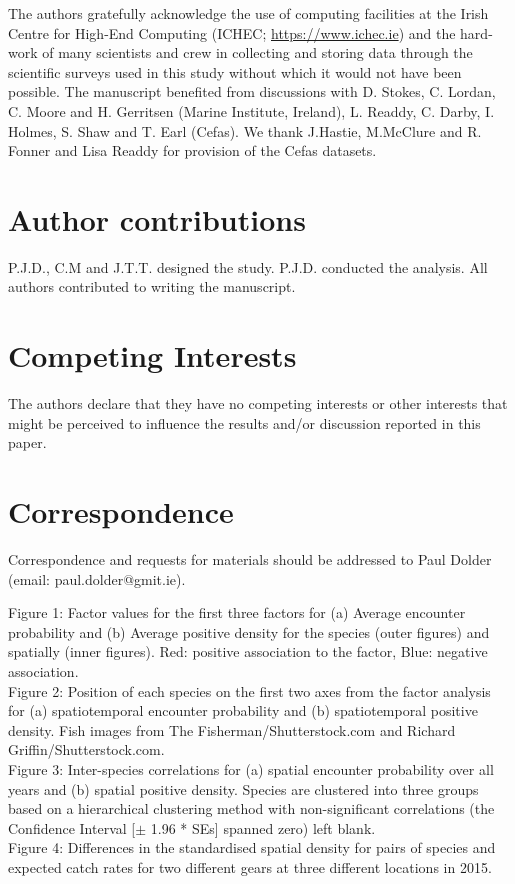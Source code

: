 \documentclass[fleqn,10pt]{wlscirep}
\begin{document}
The authors gratefully acknowledge the use of computing facilities at the Irish
Centre for High-End Computing (ICHEC; \url{https://www.ichec.ie}) and the
hard-work of many scientists and crew in collecting and storing data through
the scientific surveys used in this study without which it would not have been
possible. The manuscript benefited from discussions with D. Stokes, C.  Lordan,
C. Moore and H. Gerritsen (Marine Institute, Ireland), L.  Readdy, C.  Darby,
I. Holmes, S. Shaw and T. Earl (Cefas). We thank J.Hastie, M.McClure and R.
Fonner and Lisa Readdy for provision of the Cefas datasets.

\section*{Author contributions}
P.J.D., C.M and J.T.T. designed the study. P.J.D. conducted the analysis. All
authors contributed to writing the manuscript.  

\section*{Competing Interests}
The authors declare that they have no competing interests or other interests
that might be perceived to influence the results and/or discussion reported in
this paper.

\section*{Correspondence}
Correspondence and requests for materials should be addressed to Paul Dolder
(email: paul.dolder@gmit.ie).



\newpage

Figure 1: Factor values for the first three factors for (a) Average encounter
probability and (b) Average positive density for the species (outer figures)
and spatially (inner figures).  Red: positive association to the factor, Blue:
negative association.\\ 


Figure 2: Position of each species on the first two axes from the factor
analysis for (a) spatiotemporal encounter probability and (b) spatiotemporal
positive density. Fish images from The Fisherman/Shutterstock.com and Richard
Griffin/Shutterstock.com.\\
	
Figure 3: Inter-species correlations for (a) spatial encounter probability over
all years and (b) spatial positive density.  Species are clustered into three
groups based on a hierarchical clustering method with non-significant
correlations (the Confidence Interval [$\pm$ 1.96 * SEs] spanned zero) left
blank.\\

Figure 4: Differences in the standardised spatial density for pairs of species
and expected catch rates for two different gears at three different locations
in 2015.\\
\end{document}
